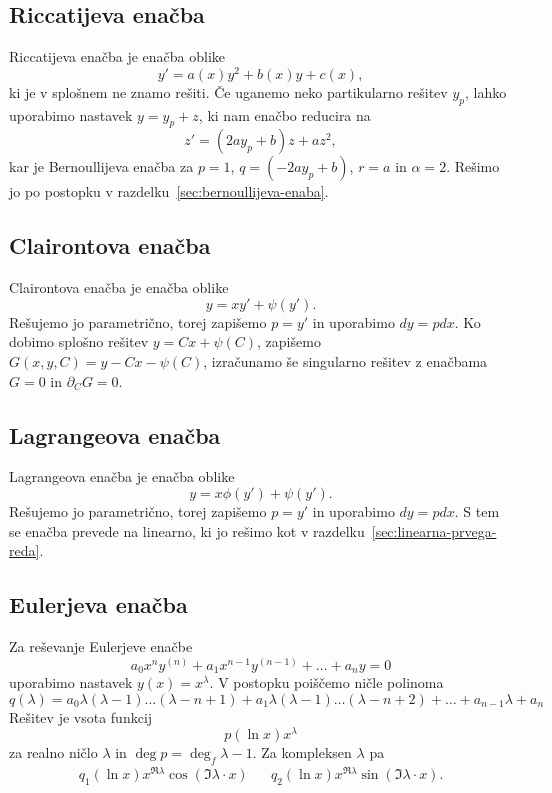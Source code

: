 \subsection{Riccatijeva enačba}%
\label{sec:riccatijeva-enacba}

Riccatijeva enačba je enačba oblike
\[
  y' = a(x) y^2 + b(x) y + c(x),
\]
ki je v splošnem ne znamo rešiti.
Če uganemo neko partikularno rešitev $y_p$, lahko uporabimo nastavek $y = y_p +
z$, ki nam enačbo reducira na
\[
  z' = (2 a y_p + b) z + a z^2,
\]
kar je Bernoullijeva enačba za $p = 1$, $q = (-2a y_p + b)$, $r = a$ in $\alpha
= 2$.
Rešimo jo po postopku v razdelku~\ref{sec:bernoullijeva-enaba}.

\subsection{Clairontova enačba}%
\label{sec:clairontova-enacba}

Clairontova enačba je enačba oblike
\[
  y = xy' + \psi(y').
\]
Rešujemo jo parametrično, torej zapišemo $p = y'$ in uporabimo $dy = p dx$.
Ko dobimo splošno rešitev $y = Cx + \psi(C)$, zapišemo $G(x, y, C) = y - Cx -
\psi(C)$, izračunamo še singularno rešitev z enačbama $G = 0$ in $\partial_C G =
0$.

\subsection{Lagrangeova enačba}%
\label{sec:lagrangeova-enacba}

Lagrangeova enačba je enačba oblike
\[
  y = x \phi(y') + \psi(y').
\]
Rešujemo jo parametrično, torej zapišemo $p = y'$ in uporabimo $dy = p dx$.
S tem se enačba prevede na linearno, ki jo rešimo kot v
razdelku~\ref{sec:linearna-prvega-reda}.

\subsection{Eulerjeva enačba}%
\label{sec:eulerjeva-enacba}

Za reševanje Eulerjeve enačbe
\[
  a_0 x^n y^{(n)} + a_1 x^{n-1} y^{(n-1)} + \ldots + a_n y = 0
\]
uporabimo nastavek $y(x) = x^\lambda$.
V postopku poiščemo ničle polinoma
\[
  q(\lambda) = a_0 \lambda (\lambda-1) \ldots (\lambda - n + 1)
  + a_1 \lambda (\lambda-1) \ldots (\lambda - n + 2)
  + \ldots
  + a_{n-1} \lambda + a_n
\]
Rešitev je vsota funkcij
\[
  p(\ln x) x^\lambda
\]
za realno ničlo $\lambda$ in $\deg p = \deg_f \lambda - 1$.
Za kompleksen $\lambda$ pa
\begin{align*}
  q_1(\ln x) x^{\Re \lambda} \cos(\Im \lambda \cdot x)
  && q_2(\ln x) x^{\Re \lambda} \sin(\Im \lambda \cdot x).
\end{align*}

